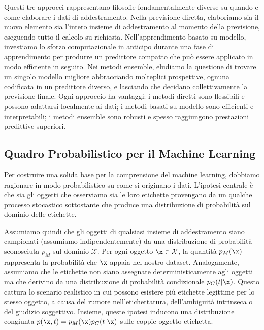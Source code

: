 
Questi tre approcci rappresentano filosofie fondamentalmente diverse su quando e come elaborare i dati di addestramento. Nella previsione diretta, elaboriamo sia il nuovo elemento sia l'intero insieme di addestramento al momento della previsione, eseguendo tutto il calcolo su richiesta. Nell'apprendimento basato su modello, investiamo lo sforzo computazionale in anticipo durante una fase di apprendimento per produrre un predittore compatto che può essere applicato in modo efficiente in seguito. Nei metodi ensemble, eludiamo la questione di trovare un singolo modello migliore abbracciando molteplici prospettive, ognuna codificata in un predittore diverso, e lasciando che decidano collettivamente la previsione finale. Ogni approccio ha vantaggi: i metodi diretti sono flessibili e possono adattarsi localmente ai dati; i metodi basati su modello sono efficienti e interpretabili; i metodi ensemble sono robusti e spesso raggiungono prestazioni predittive superiori.

\subsection*{Quadro Probabilistico per il Machine Learning}

Per costruire una solida base per la comprensione del machine learning, dobbiamo ragionare in modo probabilistico su come si originano i dati. L'ipotesi centrale è che sia gli oggetti che osserviamo sia le loro etichette provengano da un qualche processo stocastico sottostante che produce una distribuzione di probabilità sul dominio delle etichette.

Assumiamo quindi che gli oggetti di qualsiasi insieme di addestramento siano campionati (assumiamo indipendentemente) da una distribuzione di probabilità sconosciuta $p_M$ sul dominio $\mathcal{X}$. Per ogni oggetto $\x \in \mathcal{X}$, la quantità $p_M(\x)$ rappresenta la probabilità che $\x$ appaia nel nostro dataset. Analogamente, assumiamo che le etichette non siano assegnate deterministicamente agli oggetti ma che derivino da una distribuzione di probabilità condizionale $p_C(t|\x)$. Questo cattura lo scenario realistico in cui possono esistere più etichette legittime per lo stesso oggetto, a causa del rumore nell'etichettatura, dell'ambiguità intrinseca o del giudizio soggettivo. Insieme, queste ipotesi inducono una distribuzione congiunta $p(\x, t) = p_M(\x) p_C(t|\x)$ sulle coppie oggetto-etichetta.

